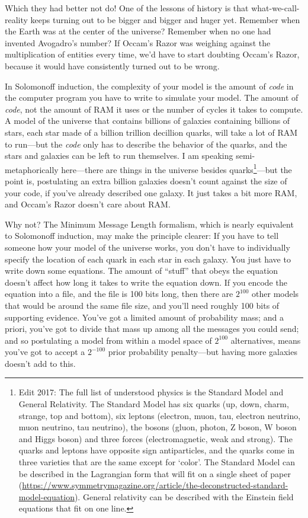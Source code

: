 {
 Which they had better not do! One of the lessons of history is
that what-we-call-reality keeps turning out to be bigger and bigger and
huger yet. Remember when the Earth was at the center of the universe?
Remember when no one had invented Avogadro's number? If
Occam's Razor was weighing against the multiplication
of entities every time, we'd have to start doubting
Occam's Razor, because it would have consistently
turned out to be wrong.}

{
 In Solomonoff induction, the complexity of your model is the
amount of \textit{code} in the computer program you have to write to
simulate your model. The amount of \textit{code}, not the amount of RAM
it uses or the number of cycles it takes to compute. A model of the
universe that contains billions of galaxies containing billions of
stars, each star made of a billion trillion decillion quarks, will take
a lot of RAM to run---but the \textit{code} only has to describe the
behavior of the quarks, and the stars and galaxies can be left to run
themselves. I am speaking semi-metaphorically here---there are things
in the universe besides quarks\footnote{Edit 2017: The full list of understood physics is the Standard Model and General Relativity.  The Standard Model has six quarks (up, down, charm, strange, top and bottom), six leptons (electron, muon, tau, electron neutrino, muon neutrino, tau neutrino), the bosons (gluon, photon, Z boson, W boson and Higgs boson) and three forces (electromagnetic, weak and strong).  The quarks and leptons have opposite sign antiparticles, and the quarks come in three varieties that are the same except for `color'.  The Standard Model can be described in the Lagrangian form that will fit on a single sheet of paper (\url{https://www.symmetrymagazine.org/article/the-deconstructed-standard-model-equation}).  General relativity can be described with the Einstein field equations that fit on one line. }---but the point is, postulating an extra
billion galaxies doesn't count against the size of your
code, if you've already described one galaxy. It just
takes a bit more RAM, and Occam's Razor
doesn't care about RAM.}

{
 Why not? The Minimum Message Length formalism, which is nearly
equivalent to Solomonoff induction, may make the principle clearer: If
you have to tell someone how your model of the universe works, you
don't have to individually specify the location of each
quark in each star in each galaxy. You just have to write down some
equations. The amount of ``stuff''
that obeys the equation doesn't affect how long it
takes to write the equation down. If you encode the equation into a
file, and the file is 100 bits long, then there are
$2^{100}$ other models that would be around the same file
size, and you'll need roughly 100 bits of supporting
evidence. You've got a limited amount of probability
mass; and a priori, you've got to divide that mass up
among all the messages you could send; and so postulating a model from
within a model space of $2^{100}$ alternatives, means
you've got to accept a $2^{-100}$ prior
probability penalty---but having more galaxies doesn't
add to this.}

